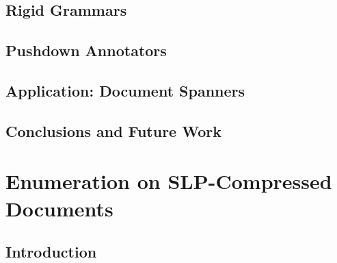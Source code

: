 \documentclass[pdftex]{pucthesis}	%
\begin{document}
\section{Rigid Grammars} \label{gram:sec:quadratic}
%

\label{gram:sec:profile}
%

%

\section{Pushdown Annotators} \label{gram:sec:linear}

%

\section{Application: Document Spanners} \label{gram:sec:spanners}

%

\section{Conclusions and Future Work}
%



\chapter[ENUMERATION ON SLP-COMPRESSED DOCUMENTS]{Enumeration on SLP-Compressed Documents} \label{ch3}

\section{Introduction}\label{slps:sec:introduction}
\end{document}
